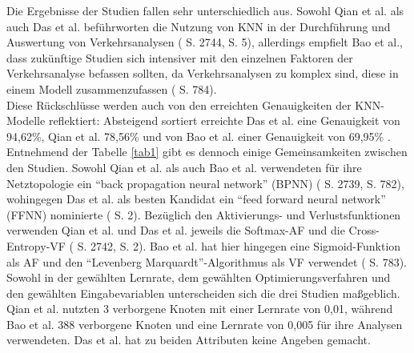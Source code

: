 \documentclass{scrartcl}
\begin{document}
Die Ergebnisse der Studien fallen sehr unterschiedlich aus. Sowohl Qian et al.
als auch Das et al. beführworten die Nutzung von KNN in der Durchführung
und Auswertung von Verkehrsanalysen (\cite{qian} S. 2744, \cite{das} S. 5),
allerdings empfielt Bao et al., dass zukünftige Studien sich intensiver mit
den einzelnen Faktoren der Verkehrsanalyse befassen sollten, da Verkehrsanalysen
zu komplex sind, diese in einem Modell zusammenzufassen (\cite{bao} S. 784).
\medskip \\
Diese Rückschlüsse werden auch von den erreichten Genauigkeiten der KNN-Modelle
reflektiert: Absteigend sortiert erreichte Das et al. eine Genauigkeit von 94,62\%, Qian et al. 78,56\%
und von Bao et al. einer Genauigkeit von 69,95\% \cite{das, qian, bao}.
\medskip \\
Entnehmend der Tabelle \ref{tab1} gibt es dennoch einige Gemeinsamkeiten
zwischen den Studien. Sowohl Qian et al. als auch Bao et al. verwendeten für
ihre Netztopologie ein \enquote{back propagation neural network} (BPNN)
(\cite{qian} S. 2739, \cite{bao} S. 782), wohingegen Das et al. als besten Kandidat
ein \enquote{feed forward neural network} (FFNN) nominierte (\cite{das} S. 2).
Bezüglich den Aktivierungs- und Verlustsfunktionen verwenden Qian et al.
und Das et al. jeweils die Softmax-AF und die Cross-Entropy-VF
(\cite{qian} S. 2742, \cite{das} S. 2).
Bao et al. hat hier hingegen eine Sigmoid-Funktion als AF und den
\enquote{Levenberg Marquardt}-Algorithmus als VF verwendet (\cite{bao} S. 783).
Sowohl in der gewählten Lernrate, dem gewählten Optimierungsverfahren und den
gewählten Eingabevariablen unterscheiden sich die drei Studien maßgeblich.
Qian et al. nutzten 3 verborgene Knoten mit einer Lernrate von 0,01, während
Bao et al. 388 verborgene Knoten und eine Lernrate von 0,005 für ihre Analysen
verwendeten. Das et al. hat zu beiden Attributen keine Angeben gemacht.
\end{document}
